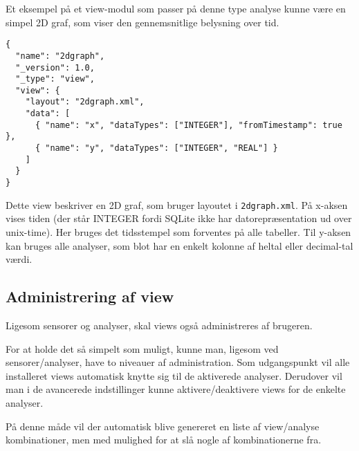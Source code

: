 Et eksempel på et view-modul som passer på denne type analyse kunne være en simpel 2D graf, som viser den gennemsnitlige belysning over tid.

\begin{lstlisting}
{
  "name": "2dgraph",
  "_version": 1.0,
  "_type": "view",
  "view": {
    "layout": "2dgraph.xml",
    "data": [
      { "name": "x", "dataTypes": ["INTEGER"], "fromTimestamp": true },
      { "name": "y", "dataTypes": ["INTEGER", "REAL"] }
    ]
  }
}
\end{lstlisting}

Dette view beskriver en 2D graf, som bruger layoutet i \texttt{2dgraph.xml}.
På x-aksen vises tiden (der står INTEGER fordi SQLite ikke har datorepræsentation ud over unix-time).
Her bruges det tidsstempel som forventes på alle tabeller.
Til y-aksen kan bruges alle analyser, som blot har en enkelt kolonne af heltal eller decimal-tal værdi.

\subsection{Administrering af view}
Ligesom sensorer og analyser, skal views også administreres af brugeren.

For at holde det så simpelt som muligt, kunne man, ligesom ved sensorer/analyser, have to niveauer af administration.
Som udgangspunkt vil alle installeret views automatisk knytte sig til de aktiverede analyser.
Derudover vil man i de avancerede indstillinger kunne aktivere/deaktivere views for de enkelte analyser.

På denne måde vil der automatisk blive genereret en liste af view/analyse kombinationer, men med mulighed for at slå nogle af kombinationerne fra.
